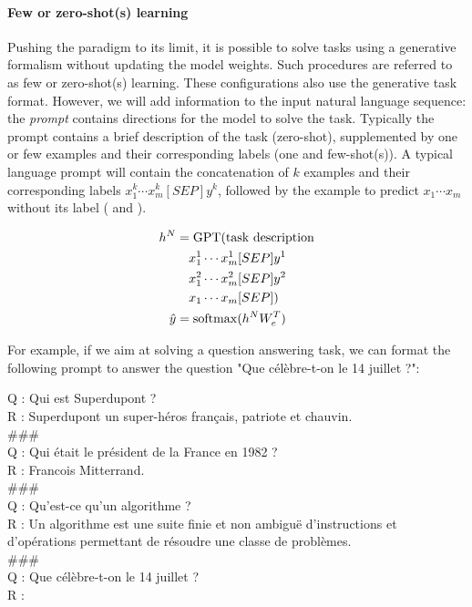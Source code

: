 \paragraph{Few or zero-shot(s) learning} Pushing the paradigm to its limit, it is possible to solve tasks using a generative formalism without updating the model weights. Such procedures are referred to as few or zero-shot(s) learning. These configurations also use the generative task format. However, we will add information to the input natural language sequence: the \textit{prompt} contains directions for the model to solve the task. Typically the prompt contains a brief description of the task (zero-shot), supplemented by one or few examples and their corresponding labels (one and few-shot(s)). A typical language prompt will contain the concatenation of $k$ examples and their corresponding labels $x^k_1 \cdots x^k_m [SEP] y^k$, followed by the example to predict $x_1 \cdots x_m$ without its label ( and ).

\begin{align}
    h^N &= \textrm{GPT}(\textrm{task description} \nonumber \\
    & \quad x^1_1 \cdots x^1_m [SEP] y^1 \nonumber \\
    & \quad x^2_1 \cdots x^2_m [SEP] y^2 \nonumber \\
    & \quad x_1 \cdots x_m [SEP]) \labeq{generative:few-shot}\\
    \hat{y} &= \softmax(h^N W_e^T) \labeq{generative:few-shot-proba-m+1}
\end{align}

For example, if we aim at solving a question answering task, we can format the following prompt to answer the question "Que célèbre-t-on le 14 juillet ?": 

Q : Qui est Superdupont ?\\
R : Superdupont un super-héros français, patriote et chauvin.\\
\#\#\#\\
Q : Qui était le président de la France en 1982 ?\\
R : Francois Mitterrand.\\
\#\#\#\\
Q : Qu'est-ce qu'un algorithme ?\\
R : Un algorithme est une suite finie et non ambiguë d'instructions et d’opérations permettant de résoudre une classe de problèmes.\\
\#\#\#\\
Q : Que célèbre-t-on le 14 juillet ?\\
R :

